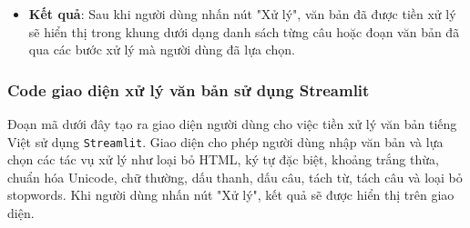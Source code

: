 \begin{itemize}
    \item \textbf{Kết quả}: 
    Sau khi người dùng nhấn nút "Xử lý", văn bản đã được tiền xử lý sẽ hiển thị trong khung dưới dạng danh sách từng câu hoặc đoạn văn bản đã qua các bước xử lý mà người dùng đã lựa chọn.
\end{itemize}

\subsubsection{Code giao diện xử lý văn bản sử dụng Streamlit}

Đoạn mã dưới đây tạo ra giao diện người dùng cho việc tiền xử lý văn bản tiếng Việt sử dụng \texttt{Streamlit}. Giao diện cho phép người dùng nhập văn bản và lựa chọn các tác vụ xử lý như loại bỏ HTML, ký tự đặc biệt, khoảng trắng thừa, chuẩn hóa Unicode, chữ thường, dấu thanh, dấu câu, tách từ, tách câu và loại bỏ stopwords. Khi người dùng nhấn nút "Xử lý", kết quả sẽ được hiển thị trên giao diện.

